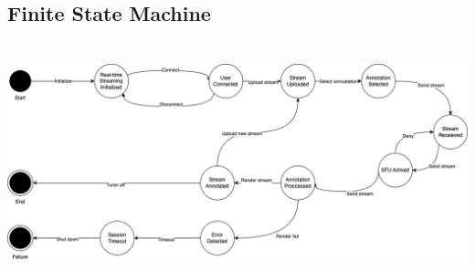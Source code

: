 \documentclass[12pt]{article}
\begin{document}
\subsection{Finite State Machine}
\includegraphics[width=15cm, height=7cm]{FSM.png}
\end{document}
